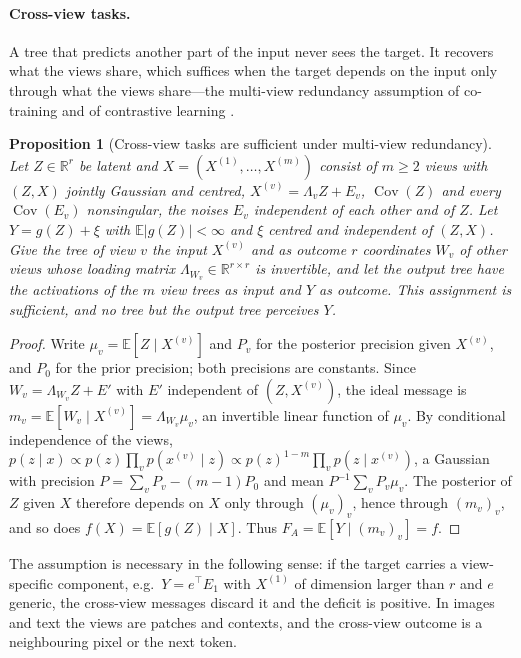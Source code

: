 \documentclass[11pt]{article}
\newtheorem{proposition}[theorem]{Proposition}
\theoremstyle{definition}
\theoremstyle{remark}
\newcommand{\R}{\mathbb{R}}
\newcommand{\E}{\mathbb{E}}
\begin{document}
\paragraph{Cross-view tasks.}
A tree that predicts another part of the input never sees the target.  It recovers what
the views share, which suffices when the target depends on the input only through what
the views share---the multi-view redundancy assumption of co-training and of
contrastive learning \citep{blum1998,tosh2021}.

\begin{proposition}[Cross-view tasks are sufficient under multi-view redundancy]\label{prop:multiview}
Let $Z\in\R^r$ be latent and $X=(X^{(1)},\dots,X^{(m)})$ consist of $m\ge2$ views with
$(Z,X)$ jointly Gaussian and centred, $X^{(v)}=\Lambda_vZ+E_v$, $\operatorname{Cov}(Z)$ and
every $\operatorname{Cov}(E_v)$ nonsingular, the noises $E_v$ independent of each other and
of $Z$.  Let $Y=g(Z)+\xi$ with $\E|g(Z)|<\infty$ and $\xi$
centred and independent of $(Z,X)$.  Give the tree of view $v$ the input $X^{(v)}$ and as
outcome $r$ coordinates $W_v$ of other views whose loading matrix $\Lambda_{W_v}\in\R^{r\times r}$
is invertible, and let the output tree have the activations of the $m$ view trees as input
and $Y$ as outcome.  This assignment is sufficient, and no tree but the output tree
perceives $Y$.
\end{proposition}
\begin{proof}
Write $\mu_v=\E[Z\mid X^{(v)}]$ and $P_v$ for the posterior precision given $X^{(v)}$, and
$P_0$ for the prior precision; both precisions are constants.  Since $W_v=\Lambda_{W_v}Z+E'$
with $E'$ independent of $(Z,X^{(v)})$, the ideal message is
$m_v=\E[W_v\mid X^{(v)}]=\Lambda_{W_v}\mu_v$, an invertible linear function of $\mu_v$.
By conditional independence of the views,
$p(z\mid x)\propto p(z)\prod_vp(x^{(v)}\mid z)\propto p(z)^{1-m}\prod_vp(z\mid x^{(v)})$,
a Gaussian with precision $P=\sum_vP_v-(m-1)P_0$ and mean $P^{-1}\sum_vP_v\mu_v$.  The
posterior of $Z$ given $X$ therefore depends on $X$ only through $(\mu_v)_v$, hence through
$(m_v)_v$, and so does $f(X)=\E[g(Z)\mid X]$.  Thus $F_A=\E[Y\mid(m_v)_v]=f$.
\end{proof}

The assumption is necessary in the following sense: if the target carries a
view-specific component, e.g.\ $Y=e^\top E_1$ with $X^{(1)}$ of dimension larger than
$r$ and $e$ generic, the cross-view messages discard it and the deficit is positive.  In images and text the
views are patches and contexts, and the cross-view outcome is a neighbouring pixel or
the next token.
\end{document}
